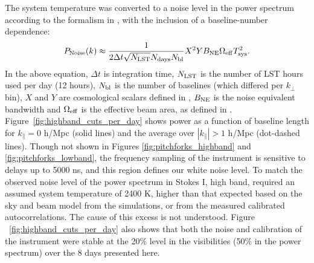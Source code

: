 \documentclass[twocolumn, trackchanges]{aastex61}
\begin{document}
The system temperature was converted to a noise level in the power spectrum
according to the formalism in \cite{Parsons.12a}, with the inclusion of a
baseline-number dependence:
\begin{equation}
P_{\rm Noise}(k) \approx \frac{1}{2\Delta t \sqrt{N_{\rm LST}} N_{\rm days} N_{\rm bl}} X^2 Y B_{\rm NE} \Omega_{\rm eff} T_{\rm sys}^2.
\end{equation}
In the above equation, $\Delta t$ is integration time, $N_{\rm LST}$ is the
number of LST hours used per day (12 hours), $N_{\rm bl}$ is the number of
baselines (which differed per $k_{\perp}$ bin), $X$ and $Y$ are cosmological
scalars defined in \cite{Parsons.12a}, $B_{\rm NE}$ is the noise equivalent
bandwidth and $\Omega_{\rm eff}$ is the effective beam area, as defined in
\cite{Parsons14}.  Figure~\ref{fig:highband_cuts_per_day} shows power as a
function of baseline length for $k_{\parallel}=0$ h/Mpc (solid lines) and the
average over $|k_{\parallel}|>1$ h/Mpc (dot-dashed lines).  Though not shown in
Figures \ref{fig:pitchforks_highband} and \ref{fig:pitchforks_lowband}, the
frequency sampling of the instrument is sensitive to delays up to 5000 ns, and
this region defines our white noise level.  To match the observed noise level of
the power spectrum in Stokes I, high band, required an assumed system
temperature of 2400 K, higher than that expected based on the sky and beam model
from the simulations, or from the measured calibrated autocorrelations.  The
cause of this excess is not understood.  Figure ~\ref{fig:highband_cuts_per_day}
also shows that both the noise and calibration of the instrument were stable at
the 20\% level in the visibilities (50\% in the power spectrum) over the 8 days
presented here.
\end{document}
